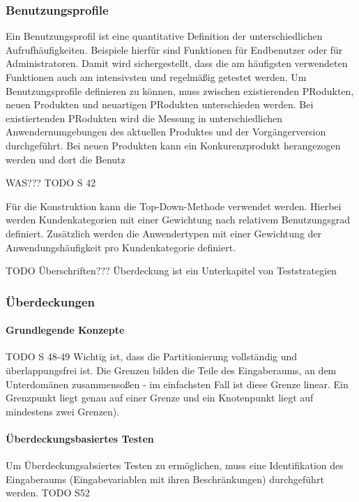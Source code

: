 \subsubsection{Benutzungsprofile}
Ein Benutzungsprofil ist eine quantitative Definition der unterschiedlichen Aufrufhäufigkeiten. Beispiele hierfür sind Funktionen für Endbenutzer oder für Administratoren. Damit wird sichergestellt, dass die am häufigsten verwendeten Funktionen auch am intensivsten und regelmäßig getestet werden. 
\linebreak
Um Benutzungsprofile definieren zu können, muss zwischen existierenden PRodukten, neuen Produkten und neuartigen PRodukten unterschieden werden. Bei existiertenden PRodukten wird die Messung in unterschiedlichen Anwendernumgebungen des aktuellen Produktes und der Vorgängerversion durchgeführt. Bei neuen Produkten kann ein Konkurenzprodukt herangezogen werden und dort die Benutz

WAS???
TODO S 42

Für die Konstruktion kann die Top-Down-Methode verwendet werden. Hierbei werden Kundenkategorien mit einer Gewichtung nach relativem Benutzungsgrad definiert. Zusätzlich werden die Anwendertypen mit einer Gewichtung der Anwendungshäufigkeit pro Kundenkategorie definiert.

TODO Überschriften??? Überdeckung ist ein Unterkapitel von Teststrategien

\subsubsection{Überdeckungen}
\paragraph{Grundlegende Konzepte} 
TODO S 48-49
Wichtig ist, dass die Partitionierung vollständig und überlappungsfrei ist. Die Grenzen bilden die Teile des Eingaberaums, an dem Unterdomänen zusammensoßen - im einfachsten Fall ist diese Grenze linear.  Ein Grenzpunkt liegt genau auf einer Grenze und ein Knotenpunkt liegt auf mindestens zwei Grenzen).

\paragraph{Überdeckungsbasiertes Testen}
Um Überdeckungsabsiertes Testen zu ermöglichen, muss eine Identifikation des  Eingaberaums (Eingabevariablen mit ihren Beschränkungen) durchgeführt werden. 
TODO S52

